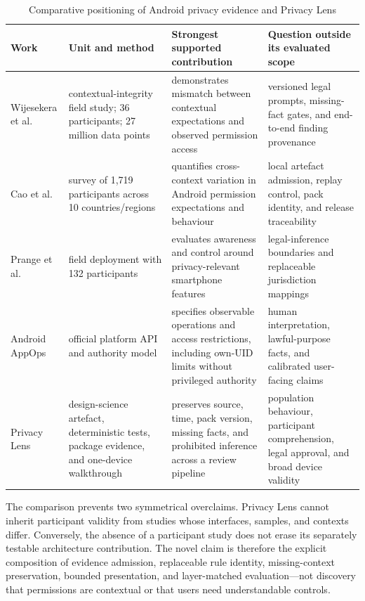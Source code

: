 \begin{table}[H]
\centering
\scriptsize
\caption{Comparative positioning of Android privacy evidence and Privacy Lens}
\label{tab:related-work-positioning}
\begin{tabular}{@{}>{\raggedright\arraybackslash}p{}>{\raggedright\arraybackslash}p{}>{\raggedright\arraybackslash}p{}>{\raggedright\arraybackslash}p{}@{}}
\toprule
Work & Unit and method & Strongest supported contribution & Question outside its evaluated scope \\
\midrule
Wijesekera et al. \cite{wijesekera2015} & contextual-integrity field study; 36 participants; 27 million data points & demonstrates mismatch between contextual expectations and observed permission access & versioned legal prompts, missing-fact gates, and end-to-end finding provenance \\
Cao et al. \cite{cao2021} & survey of 1,719 participants across 10 countries/regions & quantifies cross-context variation in Android permission expectations and behaviour & local artefact admission, replay control, pack identity, and release traceability \\
Prange et al. \cite{prange2024} & field deployment with 132 participants & evaluates awareness and control around privacy-relevant smartphone features & legal-inference boundaries and replaceable jurisdiction mappings \\
Android AppOps \cite{androidappops2026} & official platform API and authority model & specifies observable operations and access restrictions, including own-UID limits without privileged authority & human interpretation, lawful-purpose facts, and calibrated user-facing claims \\
Privacy Lens & design-science artefact, deterministic tests, package evidence, and one-device walkthrough & preserves source, time, pack version, missing facts, and prohibited inference across a review pipeline & population behaviour, participant comprehension, legal approval, and broad device validity \\
\bottomrule
\end{tabular}
\end{table}

The comparison prevents two symmetrical overclaims. Privacy Lens cannot inherit participant validity from studies whose interfaces, samples, and contexts differ. Conversely, the absence of a participant study does not erase its separately testable architecture contribution. The novel claim is therefore the explicit composition of evidence admission, replaceable rule identity, missing-context preservation, bounded presentation, and layer-matched evaluation---not discovery that permissions are contextual or that users need understandable controls.

